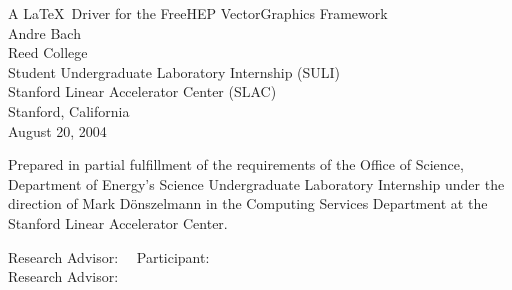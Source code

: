 \documentclass[11pt]{report}
\begin{document}
\newcommand{\sect}[1]{\section*{\center #1}}
\renewcommand{\abstractname}{\Large \textbf{Abstract}}
\renewcommand{\bibname}{\center \Large \textbf{References}}
\renewcommand{\contentsname}{\center \Large \textbf{Table of Contents}}

\begin{titlepage}

\vspace*{0.5in}
\begin{center} \LARGE A \LaTeX\ Driver for the FreeHEP VectorGraphics Framework\\[26pt]
\normalsize
Andre Bach\\[6pt]
Reed College\\[26pt]
Student Undergraduate Laboratory Internship (SULI)\\[6pt]
Stanford Linear Accelerator Center (SLAC)\\[6pt]
Stanford, California\\[26pt]
August 20, 2004
\end{center}
\vspace{39pt}
\setlength{\baselineskip}{19pt}

Prepared in partial fulfillment of the requirements of the Office of Science, Department of Energy's Science Undergraduate Laboratory Internship under the direction of Mark D\"onszelmann in the Computing Services Department at the Stanford Linear Accelerator Center.
\vspace{32pt}
\begin{tabbing}
Research Advisor:~~ \= \underline{\hspace{2in}}\kill
Participant: \> \underline{\hspace{2in}}\\[39pt]
Research Advisor: \> \underline{\hspace{2in}}
\end{tabbing}
\end{titlepage}

\setlength{\baselineskip}{26pt}

\tableofcontents
\thispagestyle{empty}
\end{document}
